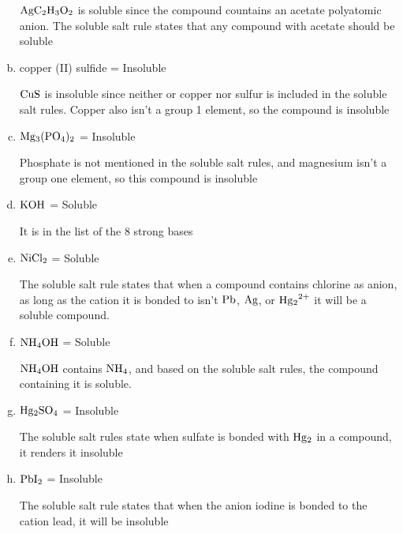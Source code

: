 \documentclass{scrartcl}
\begin{document}
\begin{enumerate}[a.]
\(\ce{AgC2H3O2}\) is soluble since the compound
countains an acetate  polyatomic anion. The soluble salt rule states that any
compound with acetate should be soluble

\item copper (II) sulfide = Insoluble

\(\ce{CuS}\) is insoluble since neither or
copper nor sulfur is included in the soluble salt rules. Copper also isn't a
group 1 element, so the compound is insoluble

\item \(\ce{Mg3(PO4)2}\) = Insoluble

Phosphate is not mentioned in the soluble
salt rules, and magnesium isn't a group one element, so this compound is
insoluble

\item \(\ce{KOH}\) = Soluble

It is in the list of the 8 strong bases

\item \(\ce{NiCl2}\) = Soluble

The soluble salt rule states that when a compound
contains chlorine as anion, as long as the cation it is bonded to isn't
\(\ce{Pb}\),     \(\ce{Ag}\), or \(\ce{Hg2^{2+}}\) it will be a soluble
compound.

\item \(\ce{NH4OH}\) = Soluble

\(\ce{NH4OH}\) contains \(\ce{NH4}\), and based on
the soluble salt rules, the compound containing it is soluble.

\item \(\ce{Hg2SO4}\) = Insoluble

The soluble salt rules state when sulfate is
bonded with     \(\ce{Hg2}\) in a compound, it renders it insoluble

\item \(\ce{PbI2}\) = Insoluble

The soluble salt rule states that when the anion
iodine is bonded to the cation lead, it will be insoluble
\end{enumerate}
\end{document}
